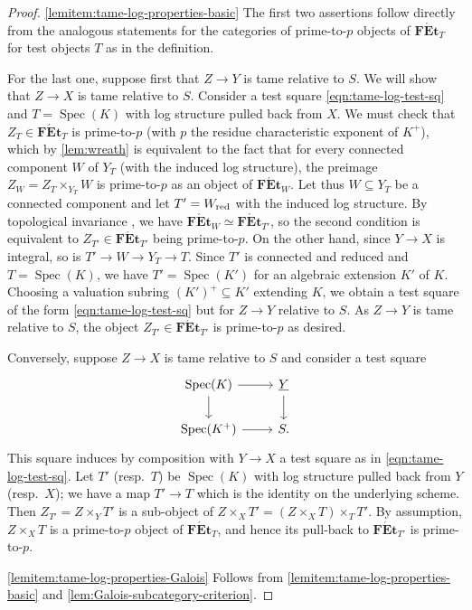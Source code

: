 \documentclass[a4paper,twoside,11pt,reqno]{amsart}
\DeclareMathOperator{\Spec}{Spec}
\newcommand{\cat}[1]{\mathbf{#1}}
\newcommand{\FEt}{\cat{F\acute{E}t}}
\theoremstyle{definition}
\numberwithin{equation}{subsection}
\begin{document}
\begin{proof}
\ref{lemitem:tame-log-properties-basic} The first two assertions follow directly from the analogous statements for the categories of prime-to-$p$ objects of $\FEt_T$ for test objects $T$ as in the definition. 

For the last one, suppose first that $Z\to Y$ is tame relative to $S$. We will show that $Z\to X$ is tame relative to $S$. Consider a test square \eqref{eqn:tame-log-test-sq} and $T=\Spec(K)$ with log structure pulled back from $X$. We must check that $Z_T\in \FEt_T$ is prime-to-$p$ (with $p$ the residue characteristic exponent of $K^+$), which by \cref{lem:wreath} is equivalent to the fact that for every connected component $W$ of $Y_T$ (with the induced log structure), the preimage $Z_W = Z_T\times_{Y_T} W$ is prime-to-$p$ as an object of $\FEt_W$. Let thus $W\subseteq Y_T$ be a connected component and let $T'=W_{\rm red}$ with the induced log structure. By topological invariance \cite[Proposition~4.2.4(d)]{AHLS-Log}, we have $\FEt_W \simeq \FEt_{T'}$, so the second condition is equivalent to $Z_{T'}\in\FEt_{T'}$ being prime-to-$p$. On the other hand, since $Y\to X$ is integral, so is $T'\to W\to Y_T\to T$. Since $T'$ is connected and reduced and $T=\Spec(K)$, we have $T'=\Spec(K')$ for an algebraic extension $K'$ of $K$. Choosing a valuation subring $(K')^+\subseteq K'$ extending $K$, we obtain a test square of the form \eqref{eqn:tame-log-test-sq} but for $Z\to Y$ relative to $S$. As $Z\to Y$ is tame relative to $S$, the object $Z_{T'}\in \FEt_{T'}$ is prime-to-$p$ as desired.

Conversely, suppose $Z\to X$ is tame relative to $S$ and consider a test square 
\[
    \begin{tikzcd}
        \Spec(K)\ar[r] \ar[d] & \underline{Y}\ar[d] \\
        \Spec(K^+) \ar[r] & S.
    \end{tikzcd}
\]
This square induces by composition with $Y\to X$ a test square as in \eqref{eqn:tame-log-test-sq}. Let $T'$ (resp.\ $T$) be $\Spec(K)$ with log structure pulled back from $Y$ (resp.\ $X$); we have a map $T'\to T$ which is the identity on the underlying scheme. Then $Z_{T'}=Z\times_{Y} T'$ is a sub-object of $Z\times_X T' = (Z\times_X T)\times_T T'$. By assumption, $Z\times_X T$ is a prime-to-$p$ object of $\FEt_T$, and hence its pull-back to $\FEt_{T'}$ is prime-to-$p$.

\ref{lemitem:tame-log-properties-Galois} 
Follows from \ref{lemitem:tame-log-properties-basic} and \cref{lem:Galois-subcategory-criterion}.


\end{proof}
\end{document}
